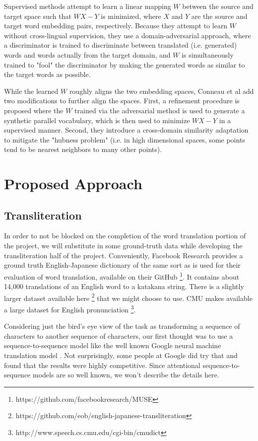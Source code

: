 \documentclass{article}
\begin{document}
Supervised methods attempt to learn a linear mapping $W$ between the source and target
space such that $WX-Y$ is minimized, where $X$ and $Y$ are the source and target word
embedding pairs, respectively. Because they attempt to learn $W$ without cross-lingual 
supervision, they use a domain-adversarial approach, where a discriminator is trained
to discriminate between translated (i.e. generated) words and words actually from the
target domain, and $W$ is simultaneously trained to "fool" the discriminator by making
the generated words as similar to the target words as possible.

While the learned $W$ roughly aligns the two embedding spaces, Conneau et al add two
modifications to further align the spaces. First, a refinement procedure is proposed
where the $W$ trained via the adversarial method is used to generate a synthetic
parallel vocabulary, which is then used to minimize $WX-Y$ in a supervised manner.
Second, they introduce a cross-domain similarity adaptation to mitigate the "hubness
problem" (i.e. in high dimensional spaces, some points tend to be nearest neighbors
to many other points).

\section*{Proposed Approach}

\subsection*{Transliteration}

In order to not be blocked on
the completion of the word translation portion of the project,
we will substitute in some ground-truth data
while developing the transliteration half of the project.
Conveniently,
Facebook Research provides a ground truth English-Japanese dictionary
of the same sort as is used for their evaluation of word translation,
available on their GitHub
\footnote{https://github.com/facebookresearch/MUSE}.
It contains about 14,000 translations of an English word to a katakana string.
There is a slightly larger dataset available here
\footnote{https://github.com/eob/english-japanese-transliteration}
that we might choose to use.
CMU makes available a large dataset for English pronunciation
\footnote{http://www.speech.cs.cmu.edu/cgi-bin/cmudict}.

Considering just the bird's eye view of the task
as transforming a sequence of characters to another sequence of characters,
our first thought was to use a sequence-to-sequence model
like the well known Google neural machine translation model
\cite{Wu2016GooglesNM}.
Not surprisingly,
some people at Google did try that \cite{Rosca2016SequencetosequenceNN}
and found that the results were highly competitive.
Since attentional sequence-to-sequence models \cite{Bahdanau2015NeuralMT}
are so well known,
we won't describe the details here.
\end{document}

